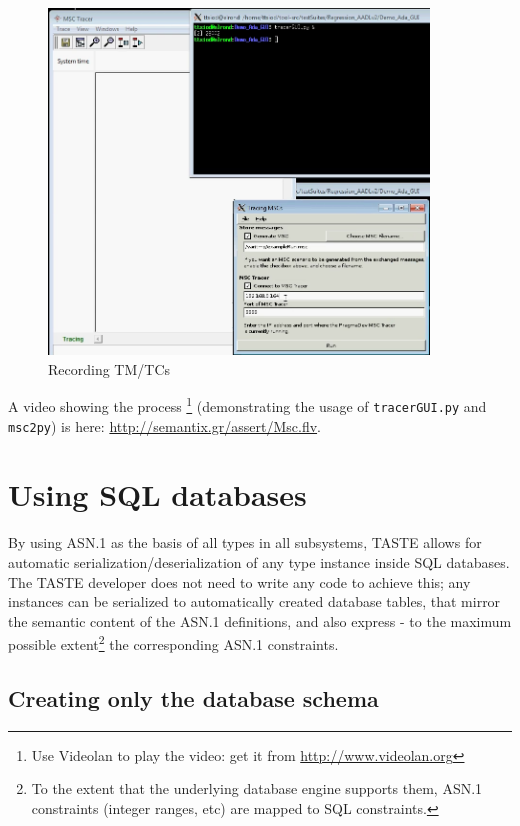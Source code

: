 \documentclass[11pt]{book}
\begin{document}
\begin{figure}
\centering
\includegraphics[width=0.9\textwidth]{imgs/record-msc}
\caption{Recording TM/TCs}
\label{mscRecorded}
\end{figure}

A video showing the process \footnote{Use Videolan to play the video: get it from \url{http://www.videolan.org}} (demonstrating the usage of {\tt tracerGUI.py} and {\tt msc2py}) is here: \url{http://semantix.gr/assert/Msc.flv}.

\chapter{Using SQL databases}

By using ASN.1 as the basis of all types in all subsystems, TASTE allows for automatic serialization/deserialization of any type instance inside SQL databases. The TASTE developer does not need to write any code to achieve this; any instances can be serialized to automatically created database tables, that mirror the semantic content of the ASN.1 definitions, and also express -  to the maximum possible extent\footnote{To the extent that the underlying database engine supports them, ASN.1 constraints (integer ranges, etc) are mapped to SQL constraints.} the corresponding ASN.1 constraints.

\section{Creating only the database schema}
\end{document}
